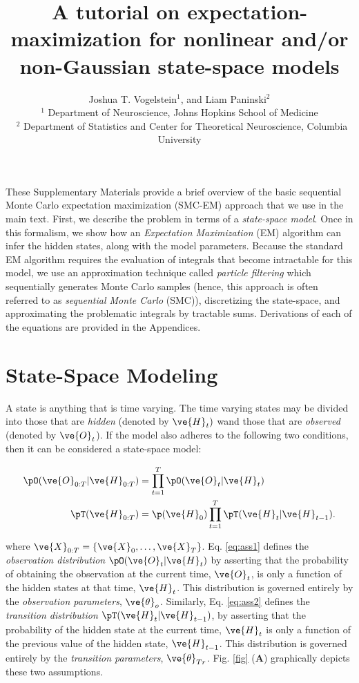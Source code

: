 \documentclass{article}
\title{A tutorial on expectation-maximization for nonlinear and/or non-Gaussian state-space models}
\author{Joshua T. Vogelstein$^1$, and Liam Paninski$^2$ \\  $^1$ Department of Neuroscience, Johns Hopkins School of Medicine \\\ $^2$ Department of Statistics and Center for Theoretical Neuroscience, Columbia University}
\begin{document}
\maketitle \tableofcontents \thispagestyle{empty} \newpage

\noindent These Supplementary Materials provide a brief overview of the basic sequential Monte Carlo expectation maximization (SMC-EM) approach that we use in the main text.  First, we describe the problem in terms of a \emph{state-space model}.  Once in this formalism, we show how an \emph{Expectation Maximization} (EM) algorithm can infer the hidden states, along with the model parameters.  Because the standard EM algorithm requires the evaluation of integrals that become intractable for this model, we use an approximation technique called \emph{particle filtering} which sequentially generates Monte Carlo samples (hence, this approach is often referred to as \emph{sequential Monte Carlo} (SMC)), discretizing the state-space, and approximating the problematic integrals by tractable sums. Derivations of each of the equations are provided in the Appendices.

\section{State-Space Modeling}

A state is anything that is time varying. The time varying states may be divided into those that are \emph{hidden} (denoted by $\ve{H}_t)$ wand those that are \emph{observed} (denoted by $\ve{O}_t$).  If the model also adheres to the following two conditions, then it can be considered a state-space model:

\begin{align}
\pO (\ve{O}_{0:T} | \ve{H}_{0:T}) & = \prod_{t=1}^T \pO(\ve{O}_t | \ve{H}_t) \label{eq:ass1}\\
\pT (\ve{H}_{0:T}) &= \p(\ve{H}_0) \prod_{t=1}^T \pT(\ve{H}_{t} | \ve{H}_{t-1}). \label{eq:ass2}
\end{align}

\noindent where $\ve{X}_{0:T} = \{\ve{X}_0, \ldots, \ve{X}_T\}$. Eq. \ref{eq:ass1} defines the \emph{observation distribution} $\pO(\ve{O}_t | \ve{H}_t)$ by asserting that the probability of obtaining the observation at the current time, $\ve{O}_t$, is only a function of the hidden states at that time, $\ve{H}_t$.  This distribution is governed entirely by the \emph{observation parameters}, $\ve{\theta}_o$.  Similarly, Eq. \ref{eq:ass2} defines the \emph{transition distribution} $\pT(\ve{H}_{t} | \ve{H}_{t-1})$, by asserting that the probability of the hidden state at the current time, $\ve{H}_t$ is only a function of the previous value of the hidden state, $\ve{H}_{t-1}$.  This distribution is governed entirely by the \emph{transition parameters}, $\ve{\theta}_{Tr}$.  Fig. \ref{fig} (\textbf{A})  graphically depicts these two assumptions.
\end{document}
